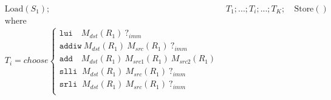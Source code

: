 \begin{align*}
&\text{Load}(S_1); \ 
&T_1; ...; T_i; ...; T_K; \ 
&\text{Store}() \\
&\text{where}\\
&T_i = choose
\begin{cases}
  \texttt{lui  }\ \ \ M_{dst}(R_1)\ \textbf{?}_{imm}\\
  \texttt{addiw}\ M_{dst}(R_1)\ M_{src}(R_1)\ \textbf{?}_{imm}\\
  \texttt{add  }\ \ \ M_{dst}(R_1)\ M_{src1}(R_1)\ M_{src2}(R_1)\\
  \texttt{slli }\ M_{dst}(R_1)\ M_{src}(R_1)\ \textbf{?}_{imm}\\
  \texttt{srli }\ M_{dst}(R_1)\ M_{src}(R_1)\ \textbf{?}_{imm}\\
\end{cases}\\
\end{align*}
